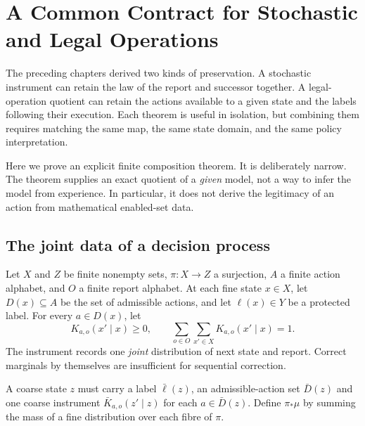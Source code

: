 \chapter{A Common Contract for Stochastic and Legal Operations}\label{ch:jointcontract}

The preceding chapters derived two kinds of preservation. A stochastic instrument can retain the law of the report and successor together. A legal-operation quotient can retain the actions available to a given state and the labels following their execution. Each theorem is useful in isolation, but combining them requires matching the same map, the same state domain, and the same policy interpretation.

Here we prove an explicit finite composition theorem. It is deliberately narrow. The theorem supplies an exact quotient of a \emph{given} model, not a way to infer the model from experience. In particular, it does not derive the legitimacy of an action from mathematical enabled-set data.

\section{The joint data of a decision process}
Let $X$ and $Z$ be finite nonempty sets, $\pi:X\to Z$ a surjection, $A$ a finite action alphabet, and $O$ a finite report alphabet. At each fine state $x\in X$, let $D(x)\subseteq A$ be the set of admissible actions, and let $\ell(x)\in Y$ be a protected label. For every $a\in D(x)$, let
\[
K_{a,o}(x'\mid x)\ge 0,\qquad
\sum_{o\in O}\sum_{x'\in X}K_{a,o}(x'\mid x)=1.
\]
The instrument records one \emph{joint} distribution of next state and report. Correct marginals by themselves are insufficient for sequential correction.

A coarse state $z$ must carry a label $\bar\ell(z)$, an admissible-action set $\bar D(z)$ and one coarse instrument $\bar K_{a,o}(z'\mid z)$ for each $a\in\bar D(z)$. Define $\pi_*\mu$ by summing the mass of a fine distribution over each fibre of $\pi$.

